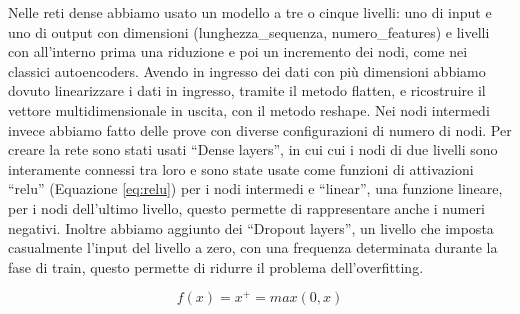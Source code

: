 Nelle reti dense abbiamo usato un modello a tre o cinque livelli: uno di input e uno di output con dimensioni (lunghezza\_sequenza, numero\_features) e livelli con all'interno prima una riduzione e poi un incremento dei nodi, come nei classici autoencoders.
Avendo in ingresso dei dati con più dimensioni abbiamo dovuto linearizzare i dati in ingresso, tramite il metodo flatten, e ricostruire il vettore multidimensionale in uscita, con il metodo reshape. Nei nodi intermedi invece abbiamo fatto delle prove con diverse configurazioni di numero di nodi.
Per creare la rete sono stati usati ``Dense layers'', in cui cui i nodi di due livelli sono interamente connessi tra loro e sono state usate come funzioni di attivazioni ``relu'' (Equazione \ref{eq:relu}) per i nodi intermedi e ``linear'', una funzione lineare, per i nodi dell'ultimo livello, questo permette di rappresentare anche i numeri negativi.
Inoltre abbiamo aggiunto dei ``Dropout layers'', un livello che imposta casualmente l'input del livello a zero, con una frequenza determinata durante la fase di train, questo permette di ridurre il problema dell'overfitting.

\begin{equation} \label{eq:relu}
    f(x) = x^+ = max(0, x)
\end{equation}

